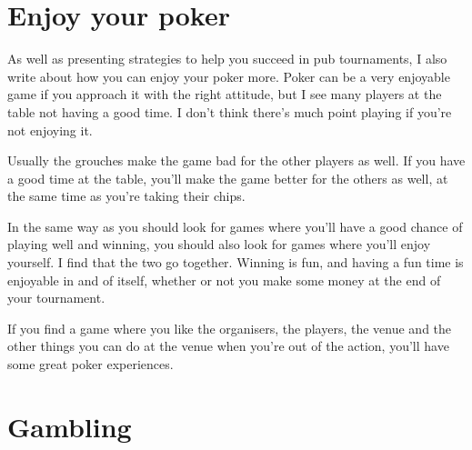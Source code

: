 

\section{Enjoy your poker}

As well as presenting strategies to help you succeed in pub
tournaments, I also write about how you can enjoy your poker
more. Poker can be a very enjoyable game if you approach
it with the right attitude, but I see many players at the table
not having a good time. I don't think there's much
point playing if you're not enjoying it.

Usually the grouches make the game bad for the other players as
well. If you have a good time at the table, you'll make the game
better for the others as well, at the same time as you're taking their
chips.

In the same way as you should look for games where you'll have a good
chance of playing well and winning, you should also look for games
where you'll enjoy yourself. I find that the two go together.
Winning is fun, and having a fun time is enjoyable in and of itself,
whether or not you make some money at the end of your tournament.

If you find a game where you like the organisers, the players,
the venue and the other things you can do at the venue when you're out
of the action, you'll have some great poker experiences.

\section{Gambling}

